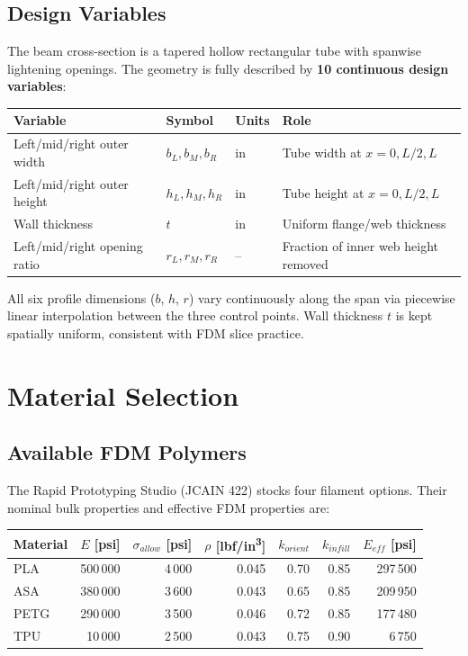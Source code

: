 \documentclass[11pt,letterpaper]{article}
\begin{document}
\subsection{Design Variables}

The beam cross-section is a tapered hollow rectangular tube with spanwise
lightening openings.  The geometry is fully described by \textbf{10 continuous
design variables}:

\begin{center}
\begin{tabular}{llll}
\toprule
Variable & Symbol & Units & Role \\
\midrule
Left/mid/right outer width   & $b_L, b_M, b_R$ & in & Tube width at $x=0,L/2,L$ \\
Left/mid/right outer height  & $h_L, h_M, h_R$ & in & Tube height at $x=0,L/2,L$ \\
Wall thickness               & $t$             & in & Uniform flange/web thickness \\
Left/mid/right opening ratio & $r_L, r_M, r_R$ & -- & Fraction of inner web height removed \\
\bottomrule
\end{tabular}
\end{center}

All six profile dimensions ($b$, $h$, $r$) vary continuously along the span
via piecewise linear interpolation between the three control points.  Wall
thickness $t$ is kept spatially uniform, consistent with FDM slice practice.


\section{Material Selection}
\label{sec:material}

\subsection{Available FDM Polymers}

The Rapid Prototyping Studio (JCAIN 422) stocks four filament options.
Their nominal bulk properties and effective FDM properties are:

\begin{center}
\begin{tabular}{lrrrrrr}
\toprule
Material & $E$ [psi] & $\sigma_{allow}$ [psi] & $\rho$ [\si{lbf/in^3}]
         & $k_{orient}$ & $k_{infill}$ & $E_{eff}$ [psi] \\
\midrule
PLA  & 500\,000 & 4\,000 & 0.045 & 0.70 & 0.85 & 297\,500 \\
ASA  & 380\,000 & 3\,600 & 0.043 & 0.65 & 0.85 & 209\,950 \\
PETG & 290\,000 & 3\,500 & 0.046 & 0.72 & 0.85 & 177\,480 \\
TPU  &  10\,000 & 2\,500 & 0.043 & 0.75 & 0.90 &   6\,750 \\
\bottomrule
\end{tabular}
\end{center}
\end{document}
